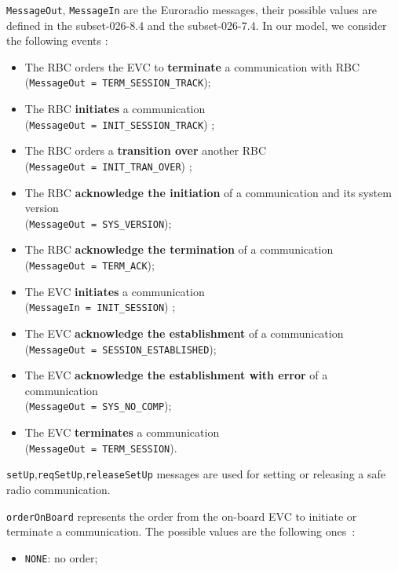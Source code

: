 \begin{description}
\item \verb+MessageOut+, \verb+MessageIn+ are the Euroradio messages, their
possible values are defined in the subset-026-8.4 and the subset-026-7.4.
 In our model, we consider the following events :
  \begin{itemize}
  \item The RBC orders the EVC to {\bf terminate} a communication with RBC \\
  (\verb+MessageOut = TERM_SESSION_TRACK+);
  \item The RBC {\bf initiates} a communication \\
  (\verb+MessageOut = INIT_SESSION_TRACK+) ;
  \item The RBC orders a {\bf transition over} another RBC \\
  (\verb+MessageOut = INIT_TRAN_OVER+) ;
  \item The RBC {\bf acknowledge the initiation} of a communication and its
  system version \\
  (\verb+MessageOut = SYS_VERSION+);
  \item The RBC {\bf acknowledge the termination} of a communication \\
  (\verb+MessageOut = TERM_ACK+);
  \item The EVC {\bf initiates} a communication \\
  (\verb+MessageIn = INIT_SESSION+) ;
  \item The EVC {\bf acknowledge the establishment} of a communication \\
  (\verb+MessageOut = SESSION_ESTABLISHED+);
  \item The EVC {\bf acknowledge the establishment with error} of a communication \\
  (\verb+MessageOut = SYS_NO_COMP+);
  \item The EVC {\bf terminates} a communication  \\
  (\verb+MessageOut = TERM_SESSION+).
  \end{itemize}
\item \verb+setUp+,\verb+reqSetUp+,\verb+releaseSetUp+ messages are used for setting
or releasing a safe radio communication.
\item \verb+orderOnBoard+ represents the order from the on-board EVC to initiate
or terminate a communication. The possible values are the following ones~: 
  \begin{itemize}
  \item \verb+NONE+:  no order;

\end{itemize}
\end{description}
